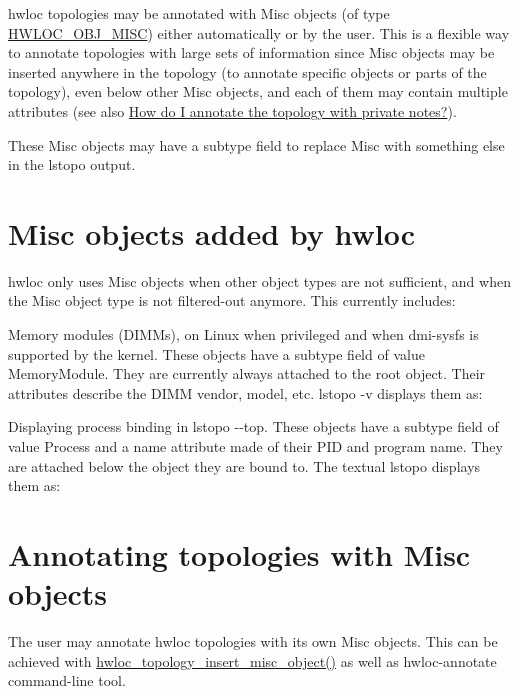 

hwloc topologies may be annotated with Misc objects (of type {\ttfamily \hyperlink{a00184_ggacd37bb612667dc437d66bfb175a8dc55a19f8a6953fa91efc76bcbcdf2d22de4d}{H\+W\+L\+O\+C\+\_\+\+O\+B\+J\+\_\+\+M\+I\+SC}}) either automatically or by the user. This is a flexible way to annotate topologies with large sets of information since Misc objects may be inserted anywhere in the topology (to annotate specific objects or parts of the topology), even below other Misc objects, and each of them may contain multiple attributes (see also \hyperlink{a00394_faq_annotate}{How do I annotate the topology with private notes?}).

These Misc objects may have a {\ttfamily subtype} field to replace {\ttfamily Misc} with something else in the lstopo output.

 \hypertarget{a00385_miscobjs_auto}{}\section{Misc objects added by hwloc}\label{a00385_miscobjs_auto}
hwloc only uses Misc objects when other object types are not sufficient, and when the Misc object type is not filtered-\/out anymore. This currently includes\+: 
\begin{DoxyItemize}
\item Memory modules (D\+I\+M\+Ms), on Linux when privileged and when {\ttfamily dmi-\/sysfs} is supported by the kernel. These objects have a {\ttfamily subtype} field of value {\ttfamily Memory\+Module}. They are currently always attached to the root object. Their attributes describe the D\+I\+MM vendor, model, etc. {\ttfamily lstopo -\/v} displays them as\+: 
  
\item Displaying process binding in {\ttfamily lstopo -\/-\/top}. These objects have a {\ttfamily subtype} field of value {\ttfamily Process} and a name attribute made of their P\+ID and program name. They are attached below the object they are bound to. The textual {\ttfamily lstopo} displays them as\+: 
  
\end{DoxyItemize}

 \hypertarget{a00385_miscobjs_annotate}{}\section{Annotating topologies with Misc objects}\label{a00385_miscobjs_annotate}
The user may annotate hwloc topologies with its own Misc objects. This can be achieved with {\ttfamily \hyperlink{a00194_gad980782ade737900c5cf208946768c30}{hwloc\+\_\+topology\+\_\+insert\+\_\+misc\+\_\+object()}} as well as hwloc-\/annotate command-\/line tool. 